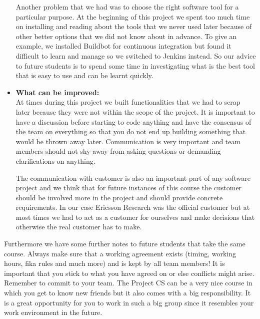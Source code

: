 \begin{itemize}
Another problem that we had was to choose the right software tool for a particular purpose. At the 
beginning of this project we spent too much time on installing and reading about the tools that we never 
used later because of other better options that we did not know about in advance. To give an example, we installed Buildbot for continuous integration but found 
it difficult to learn and manage so we switched to Jenkins instead. So our advice to future students is to 
spend some time in investigating what is the best tool that is easy to use and can be learnt quickly.

\item{\textbf{What can be improved:}}\\
 At times during this project we built functionalities that we had to scrap later because they were not 
 within the scope of the project. It is important to have a discussion before starting to code anything 
 and have the consensus of the team on everything so that you do not end up building something that would 
 be thrown away later. Communication is very important and team members should not shy away from asking 
 questions or demanding clarifications on anything.  
 
The communication with customer is also an important part of any software project and we think that 
for future instances of this course the customer should be involved more in the project and should 
provide concrete requirements. In our case Ericsson Research was the official customer 
but at most times we had to act as a customer for ourselves and make decisions that otherwise the real 
customer has to make. 
\end{itemize}

Furthermore we have some further notes to future students that take the same course.
Always make sure that a working agreement exists (timing, working hours, fika rules and much more) and
is kept by all team members! It is important that you stick to what you have agreed on or else
conflicts might arise. 
Remember to commit to your team. The Project CS can be a very nice course in which you
get to know new friends but it also comes with a big responsibility.
It is a great opportunity for you to work in such a big group since
it resembles your work environment in the future.
